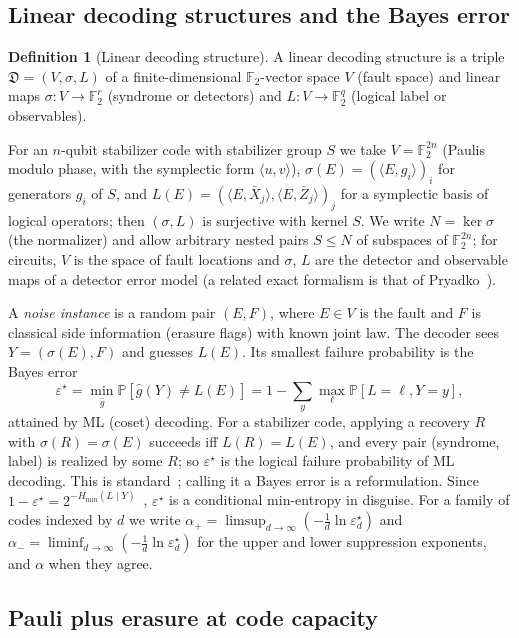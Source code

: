 \documentclass[11pt,a4paper]{article}
\theoremstyle{plain}
\theoremstyle{definition}
\newtheorem{definition}[theorem]{Definition}
\theoremstyle{remark}
\newcommand{\F}{\mathbb{F}_2}
\newcommand{\Prob}{\mathbb{P}}
\newcommand{\err}{\varepsilon^{\star}}
\begin{document}
\subsection{Linear decoding structures and the Bayes error}

\begin{definition}[Linear decoding structure]\label{def:structure}
A linear decoding structure is a triple $\mathfrak D=(V,\sigma,L)$ of a finite-dimensional $\F$-vector space $V$ (fault space) and linear maps $\sigma:V\to\F^r$ (syndrome or detectors) and $L:V\to\F^q$ (logical label or observables).
\end{definition}

For an $n$-qubit stabilizer code with stabilizer group $S$ we take $V=\F^{2n}$ (Paulis modulo phase, with the symplectic form $\langle u,v\rangle$), $\sigma(E)=(\langle E,g_i\rangle)_i$ for generators $g_i$ of $S$, and $L(E)=(\langle E,\bar X_j\rangle,\langle E,\bar Z_j\rangle)_j$ for a symplectic basis of logical operators; then $(\sigma,L)$ is surjective with kernel $S$. We write $N=\ker\sigma$ (the normalizer) and allow arbitrary nested pairs $S\le N$ of subspaces of $\F^{2n}$; for circuits, $V$ is the space of fault locations and $\sigma$, $L$ are the detector and observable maps of a detector error model (a related exact formalism is that of Pryadko~\cite{Pryadko}).

A \emph{noise instance} is a random pair $(E,F)$, where $E\in V$ is the fault and $F$ is classical side information (erasure flags) with known joint law. The decoder sees $Y=(\sigma(E),F)$ and guesses $L(E)$. Its smallest failure probability is the Bayes error
\[
\err=\min_{\hat g}\Prob[\hat g(Y)\ne L(E)]=1-\sum_y\max_\ell\Prob[L=\ell,Y=y],
\]
attained by ML (coset) decoding. For a stabilizer code, applying a recovery $R$ with $\sigma(R)=\sigma(E)$ succeeds iff $L(R)=L(E)$, and every pair (syndrome, label) is realized by some $R$; so $\err$ is the logical failure probability of ML decoding. This is standard~\cite{DKLP,IyerPoulin,BSV}; calling it a Bayes error is a reformulation. Since $1-\err=2^{-H_{\min}(L\mid Y)}$~\cite{KRS}, $\err$ is a conditional min-entropy in disguise. For a family of codes indexed by $d$ we write $\alpha_+=\limsup_{d\to\infty}(-\tfrac1d\ln\err_d)$ and $\alpha_-=\liminf_{d\to\infty}(-\tfrac1d\ln\err_d)$ for the upper and lower suppression exponents, and $\alpha$ when they agree.

\subsection{Pauli plus erasure at code capacity}
\end{document}
